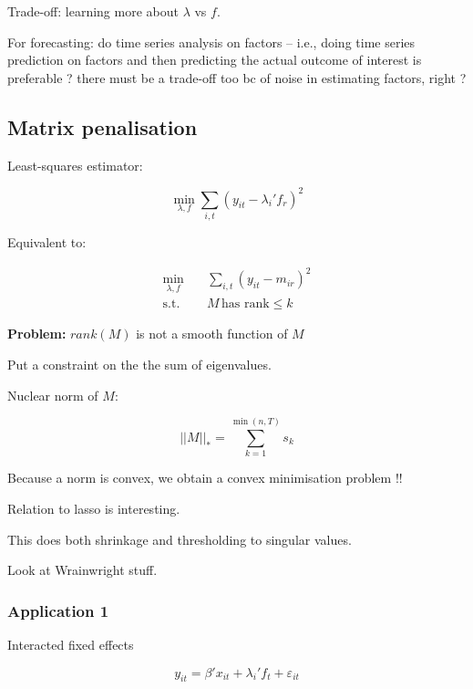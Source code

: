 \documentclass[a4paper,12pt,twoside]{article}
\begin{document}
Trade-off: learning more about $\lambda$ vs $f$.

For forecasting: do time series analysis on factors -- i.e., doing time series prediction on factors and then predicting the actual outcome of interest is preferable ? there must be a trade-off too bc of noise in estimating factors, right ?


\subsection*{Matrix penalisation}

Least-squares estimator:

\begin{equation}
	\min_{\lambda, f} \sum_{i, t} \left( y_{it} - \lambda_i' f_r \right)^2
\end{equation}

Equivalent to:

\begin{equation}
	\begin{split}
		\min_{\lambda, f} & \quad \sum_{i, t} \left( y_{it} - m_{ir} \right)^2 \\
		\textrm{s.t.} & \quad M \, \text{has rank} \leq k
	\end{split}
\end{equation}

\textbf{Problem:} $rank (M)$ is not a smooth function of $M$

Put a constraint on the the sum of eigenvalues.

Nuclear norm of $M$:

\begin{equation}
  || M ||_{*} = \sum_{k = 1}^{\min (n,  T)} s_k
\end{equation}

Because a norm is convex, we obtain a convex minimisation problem !!

Relation to lasso is interesting.

This does both shrinkage and thresholding to singular values.

Look at Wrainwright stuff.

\subsubsection*{Application 1}

Interacted fixed effects

\begin{equation}
	y_{it} = \beta' x_{it} + \lambda_i' f_t + \varepsilon_{it}
\end{equation}
\end{document}
